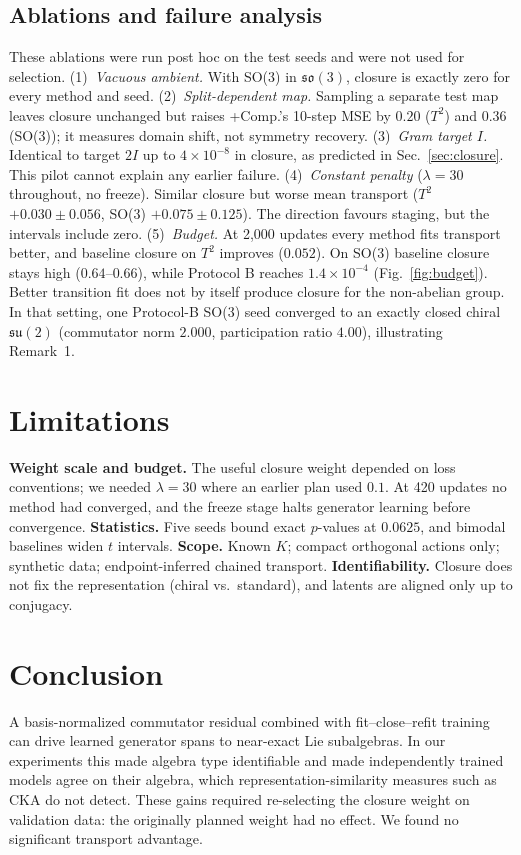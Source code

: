\documentclass[10pt]{article}
\newcommand{\so}{\mathfrak{so}}
\begin{document}
\subsection{Ablations and failure analysis}
These ablations were run post hoc on the test seeds and were not used for selection.
(1)~\emph{Vacuous ambient.} With SO(3) in $\so(3)$, closure is exactly zero for every method and seed.
(2)~\emph{Split-dependent map.} Sampling a separate test map leaves closure unchanged but raises +Comp.'s 10-step
MSE by $0.20$ ($T^2$) and $0.36$ (SO(3)); it measures domain shift, not symmetry recovery.
(3)~\emph{Gram target $I$.} Identical to target $2I$ up to $4\times10^{-8}$ in closure, as predicted in
Sec.~\ref{sec:closure}. This pilot cannot explain any earlier failure.
(4)~\emph{Constant penalty} ($\lambda=30$ throughout, no freeze). Similar closure but worse mean transport ($T^2$
$+0.030\pm0.056$, SO(3) $+0.075\pm0.125$). The direction favours staging, but the intervals include zero.
(5)~\emph{Budget.} At 2,000 updates every method fits transport better, and baseline closure on $T^2$ improves
($0.052$). On SO(3) baseline closure stays high ($0.64$--$0.66$), while Protocol B reaches $1.4\times10^{-4}$
(Fig.~\ref{fig:budget}). Better transition fit does not by itself produce closure for the non-abelian group. In
that setting, one Protocol-B SO(3) seed converged to an exactly closed chiral $\mathfrak{su}(2)$ (commutator norm
$2.000$, participation ratio $4.00$), illustrating Remark~1.

\section{Limitations}
\textbf{Weight scale and budget.} The useful closure weight depended on loss conventions; we needed $\lambda=30$
where an earlier plan used $0.1$. At 420 updates no method had converged, and the freeze stage halts generator
learning before convergence.
\textbf{Statistics.} Five seeds bound exact $p$-values at $0.0625$, and bimodal baselines widen $t$ intervals.
\textbf{Scope.} Known $K$; compact orthogonal actions only; synthetic data; endpoint-inferred chained transport.
\textbf{Identifiability.} Closure does not fix the representation (chiral vs.\ standard), and latents are aligned
only up to conjugacy.

\section{Conclusion}
A basis-normalized commutator residual combined with fit--close--refit training can drive learned generator spans to
near-exact Lie subalgebras. In our experiments this made algebra type identifiable and made independently trained
models agree on their algebra, which representation-similarity measures such as CKA do not detect. These gains
required re-selecting the closure weight on validation data: the originally planned weight had no effect. We found
no significant transport advantage.
\end{document}
